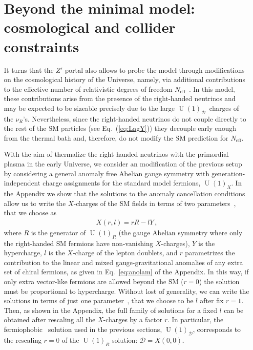\documentclass[12pt]{article}
\begin{document}

\section{Beyond the minimal model: cosmological and collider constraints}
\label{sec:CosmoConstraints}
It turns that the $Z'$ portal also allows to probe the model through modifications on the cosmological history of the Universe, namely, via additional contributions to the effective number of relativistic degrees of freedom $N_{\text{eff}}$~\cite{Dolgov:2002wy}. In this model, these contributions arise from the presence of the right-handed neutrinos and may be expected to be sizeable precisely due to the large $\operatorname{U}(1)_{\mathcal{D}}$~charges of the $\nu_R$'s.  Nevertheless, since the right-handed neutrinos do not couple directly to the rest of the SM particles (see Eq.~(\ref{eq:LagY}))  they  decouple early enough from the thermal bath and, therefore, do not modify the SM prediction for $N_{\text{eff}}$.

With the aim of thermalize the right-handed neutrinos with the
primordial plasma in the early Universe, we consider an modification of
the previous setup by considering a general anomaly free Abelian gauge
symmetry with generation-independent charge assignments for the
standard model fermions, $\operatorname{U}(1)_{X}$.
% 
In the Appendix we show that the solutions to the anomaly cancellation conditions
allow us to write the $X$-charges of the SM fields in terms
of two parameters~\cite{Appelquist:2002mw,Campos:2017dgc}, that we choose as
\begin{align}
  X(r,l)=r R - l Y\,,
\end{align}
where $R$ is the generator of $\operatorname{U}(1)_R$ (the gauge Abelian symmetry where only the right-handed SM fermions have non-vanishing $X$-charges), $Y$ is the hypercharge, $l$ is the $X$-charge of the lepton doublets, and $r$ parametrizes the contribution to the linear and mixed gauge-gravitational anomalies of any extra set of chiral fermions, as given in Eq.~\eqref{eq:anolam} of the Appendix.
In this way, if only extra vector-like fermions are allowed beyond the SM ($r=0$) the solution must be proportional to hypercharge.
%
Without lost of generality, we can write the solutions in terms of just one parameter~\cite{Jenkins:1987ue,Oda:2015gna,Okada:2018tgy}, that we choose to be $l$  after fix $r=1$. Then, as shown in the Appendix, the full family of solutions for a fixed $l$ can be obtained after  rescaling all the $X$-charges by a factor $r$. In particular, the fermiophobic~\cite{Campos:2017dgc,Bertuzzo:2018itn,Bertuzzo:2018ftf} solution used in the previous sections, $\operatorname{U}(1)_{\mathcal{D}}$, corresponds to the rescaling $r=0$ of the $\operatorname{U}(1)_R$ solution: $\mathcal{D}=X(0,0)$. 
\end{document}
